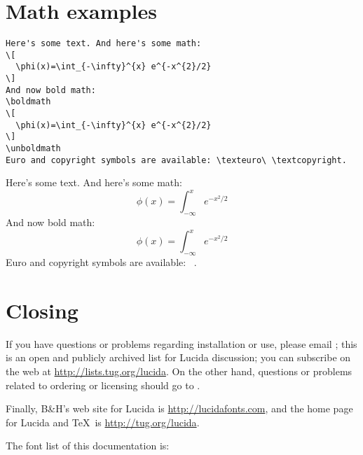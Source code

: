 \documentclass[11pt]{article}
\begin{document}
\section{Math examples}

\begin{verbatim}
Here's some text. And here's some math:
\[ 
  \phi(x)=\int_{-\infty}^{x} e^{-x^{2}/2} 
\]
And now bold math:
\boldmath
\[ 
  \phi(x)=\int_{-\infty}^{x} e^{-x^{2}/2} 
\]
\unboldmath
Euro and copyright symbols are available: \texteuro\ \textcopyright.
\end{verbatim}

Here's some text. And here's some math:
\[ 
  \phi(x)=\int_{-\infty}^{x} e^{-x^{2}/2} 
\]
And now bold math:
\boldmath
\[ 
  \phi(x)=\int_{-\infty}^{x} e^{-x^{2}/2} 
\]
\unboldmath
Euro and copyright symbols are available: \texteuro\ \textcopyright.


\section{Closing}

If you have questions or problems regarding installation or use, please
email ; this is an open and publicly archived list
for Lucida discussion; you can subscribe on the web at
\url{http://lists.tug.org/lucida}.  On the other hand, questions or
problems related to ordering or licensing should go to
.

Finally, B\&H's web site for Lucida is \url{http://lucidafonts.com},
and the home page for Lucida and \TeX\ is \url{http://tug.org/lucida}.

The font list of this documentation is:

\footnotesize\ttfamily
\expandafter\IfFileExists\expandafter{\jobname.txt}%
  {}{}

\normalfont\rmfamily

\nocite{*}
\printbibliography
\end{document}
